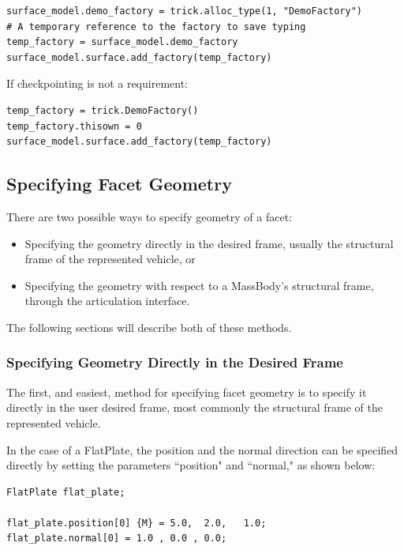 \begin{verbatim}
surface_model.demo_factory = trick.alloc_type(1, "DemoFactory")
# A temporary reference to the factory to save typing
temp_factory = surface_model.demo_factory
surface_model.surface.add_factory(temp_factory)
\end{verbatim}

If checkpointing is not a requirement:

\begin{verbatim}
temp_factory = trick.DemoFactory()
temp_factory.thisown = 0
surface_model.surface.add_factory(temp_factory)
\end{verbatim}

\subsection{Specifying Facet Geometry}

There are two possible ways to specify geometry of a facet:

\begin{itemize}
\item{Specifying the geometry directly in the desired frame, usually the structural frame
of the represented vehicle, or}
\item{Specifying the geometry with respect to a MassBody's structural frame, through the
articulation interface.}
\end{itemize}

The following sections will describe both of these methods.

\subsubsection{Specifying Geometry Directly in the Desired Frame}

The first, and easiest, method for specifying facet geometry is
to specify it directly in the user desired frame, most commonly
the structural frame of the represented vehicle.

In the case of a FlatPlate, the position and the normal direction
can be specified directly by setting the parameters ``position" and
``normal," as shown below:

\begin{verbatim}
FlatPlate flat_plate;

flat_plate.position[0] {M} = 5.0,  2.0,   1.0;
flat_plate.normal[0] = 1.0 , 0.0 , 0.0; 
\end{verbatim}


